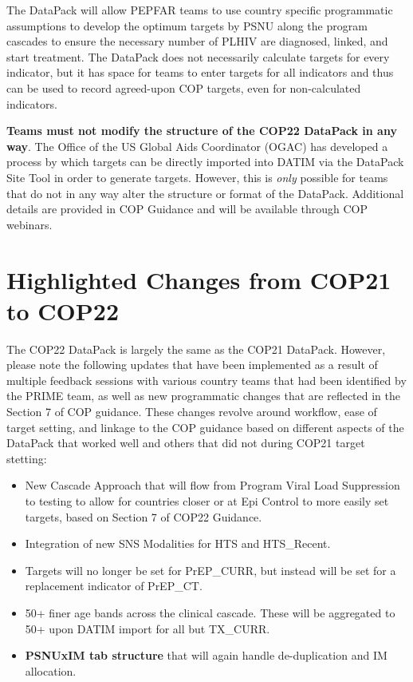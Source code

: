 \documentclass[
  openany]{book}
\begin{document}
The DataPack will allow PEPFAR teams to use country specific
programmatic assumptions to develop the optimum targets by PSNU along
the program cascades to ensure the necessary number of PLHIV are
diagnosed, linked, and start treatment. The DataPack does not
necessarily calculate targets for every indicator, but it has space for
teams to enter targets for all indicators and thus can be used to record
agreed-upon COP targets, even for non-calculated indicators.

\textbf{Teams must not modify the structure of the COP22 DataPack in any
way}. The Office of the US Global Aids Coordinator (OGAC) has developed
a process by which targets can be directly imported into DATIM via the
DataPack Site Tool in order to generate targets. However, this is \emph{only}
possible for teams that do not in any way alter the structure or format
of the DataPack. Additional details are provided in COP Guidance and
will be available through COP webinars.

\hypertarget{highlighted-changes-from-cop21-to-cop22}{%
\section{Highlighted Changes from COP21 to COP22}\label{highlighted-changes-from-cop21-to-cop22}}

The COP22 DataPack is largely the same as the COP21 DataPack. However,
please note the following updates that have been implemented as a result
of multiple feedback sessions with various country teams that had been
identified by the PRIME team, as well as new programmatic changes that
are reflected in the Section 7 of COP guidance. These changes revolve
around workflow, ease of target setting, and linkage to the COP guidance
based on different aspects of the DataPack that worked well and others
that did not during COP21 target stetting:

\begin{itemize}
\item
  New Cascade Approach that will flow from Program Viral Load
  Suppression to testing to allow for countries closer or at Epi
  Control to more easily set targets, based on Section 7 of COP22
  Guidance.
\item
  Integration of new SNS Modalities for HTS and HTS\_Recent.
\item
  Targets will no longer be set for PrEP\_CURR, but instead will be set
  for a replacement indicator of PrEP\_CT.
\item
  50+ finer age bands across the clinical cascade. These will be
  aggregated to 50+ upon DATIM import for all but TX\_CURR.
\item
  \textbf{PSNUxIM tab structure} that will again handle de-duplication and
  IM allocation.
\end{itemize}
\end{document}
